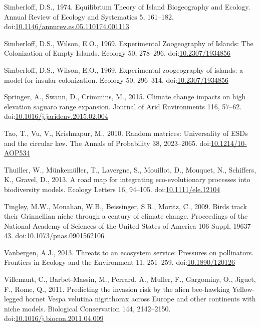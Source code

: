 \hypertarget{ref-Simberloff1974a}{}
Simberloff, D.S., 1974. Equilibrium Theory of Island Biogeography and
Ecology. Annual Review of Ecology and Systematics 5, 161--182.
doi:\href{https://doi.org/10.1146/annurev.es.05.110174.001113}{10.1146/annurev.es.05.110174.001113}

\hypertarget{ref-Simberloff1969}{}
Simberloff, D.S., Wilson, E.O., 1969. Experimental Zoogeography of
Islands: The Colonization of Empty Islands. Ecology 50, 278--296.
doi:\href{https://doi.org/10.2307/1934856}{10.2307/1934856}

\hypertarget{ref-Simberloff1969a}{}
Simberloff, D.S., Wilson, E.O., 1969. Experimental zoogeography of
islands: a model for insular colonization. Ecology 50, 296--314.
doi:\href{https://doi.org/10.2307/1934856}{10.2307/1934856}

\hypertarget{ref-Springer2015}{}
Springer, A., Swann, D., Crimmins, M., 2015. Climate change impacts on
high elevation saguaro range expansion. Journal of Arid Environments
116, 57--62.
doi:\href{https://doi.org/10.1016/j.jaridenv.2015.02.004}{10.1016/j.jaridenv.2015.02.004}

\hypertarget{ref-Tao2010}{}
Tao, T., Vu, V., Krishnapur, M., 2010. Random matrices: Universality of
ESDs and the circular law. The Annals of Probability 38, 2023--2065.
doi:\href{https://doi.org/10.1214/10-AOP534}{10.1214/10-AOP534}

\hypertarget{ref-Thuiller2013}{}
Thuiller, W., Münkemüller, T., Lavergne, S., Mouillot, D., Mouquet, N.,
Schiffers, K., Gravel, D., 2013. A road map for integrating
eco-evolutionary processes into biodiversity models. Ecology Letters 16,
94--105. doi:\href{https://doi.org/10.1111/ele.12104}{10.1111/ele.12104}

\hypertarget{ref-Tingley2009}{}
Tingley, M.W., Monahan, W.B., Beissinger, S.R., Moritz, C., 2009. Birds
track their Grinnellian niche through a century of climate change.
Proceedings of the National Academy of Sciences of the United States of
America 106 Suppl, 19637--43.
doi:\href{https://doi.org/10.1073/pnas.0901562106}{10.1073/pnas.0901562106}

\hypertarget{ref-Vanbergen2013}{}
Vanbergen, A.J., 2013. Threats to an ecosystem service: Pressures on
pollinators. Frontiers in Ecology and the Environment 11, 251--259.
doi:\href{https://doi.org/10.1890/120126}{10.1890/120126}

\hypertarget{ref-Villemant2011}{}
Villemant, C., Barbet-Massin, M., Perrard, A., Muller, F., Gargominy,
O., Jiguet, F., Rome, Q., 2011. Predicting the invasion risk by the
alien bee-hawking Yellow-legged hornet Vespa velutina nigrithorax across
Europe and other continents with niche models. Biological Conservation
144, 2142--2150.
doi:\href{https://doi.org/10.1016/j.biocon.2011.04.009}{10.1016/j.biocon.2011.04.009}


